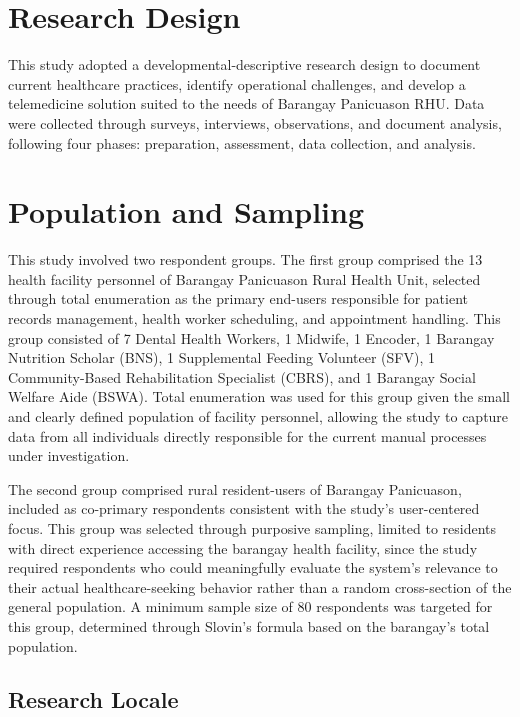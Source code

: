 \documentclass{research}
\begin{document}
\section{Research Design}
This study adopted a developmental-descriptive research design to document current healthcare practices, identify operational challenges, and develop a telemedicine solution suited to the needs of Barangay Panicuason RHU. Data were collected through surveys, interviews, observations, and document analysis, following four phases: preparation, assessment, data collection, and analysis.

\section{Population and Sampling}
This study involved two respondent groups. The first group comprised the 13 health facility personnel of Barangay Panicuason Rural Health Unit, selected through total enumeration as the primary end-users responsible for patient records management, health worker scheduling, and appointment handling. This group consisted of 7 Dental Health Workers, 1 Midwife, 1 Encoder, 1 Barangay Nutrition Scholar (BNS), 1 Supplemental Feeding Volunteer (SFV), 1 Community-Based Rehabilitation Specialist (CBRS), and 1 Barangay Social Welfare Aide (BSWA). Total enumeration was used for this group given the small and clearly defined population of facility personnel, allowing the study to capture data from all individuals directly responsible for the current manual processes under investigation.

The second group comprised rural resident-users of Barangay Panicuason, included as co-primary respondents consistent with the study's user-centered focus. This group was selected through purposive sampling, limited to residents with direct experience accessing the barangay health facility, since the study required respondents who could meaningfully evaluate the system's relevance to their actual healthcare-seeking behavior rather than a random cross-section of the general population. A minimum sample size of 80 respondents was targeted for this group, determined through Slovin's formula based on the barangay's total population.



\subsection{Research Locale}
\end{document}
